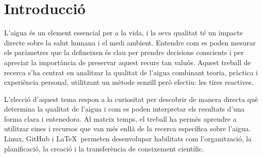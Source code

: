 \chapter{Introducció}
\label{c:intro}
%
%
%
%

L’aigua és un element essencial per a la vida, i la seva qualitat té un impacte directe sobre la salut humana i el medi ambient. Entendre com es poden mesurar els paràmetres que la defineixen és clau per prendre decisions conscients i per apreciar la importància de preservar aquest recurs tan valuós. Aquest treball de recerca s’ha centrat en analitzar la qualitat de l’aigua combinant teoria, pràctica i experiència personal, utilitzant un mètode senzill però efectiu: les tires reactives.

L’elecció d’aquest tema respon a la curiositat per descobrir de manera directa què determina la qualitat de l’aigua i com es poden interpretar els resultats d’una forma clara i entenedora. Al mateix temps, el treball ha permès aprendre a utilitzar eines i recursos que van més enllà de la recerca específica sobre l'aigua. Linux, GitHub i \LaTeX~permeten desenvolupar habilitats com l’organització, la planificació, la creació i la transferència de coneixement científic.

